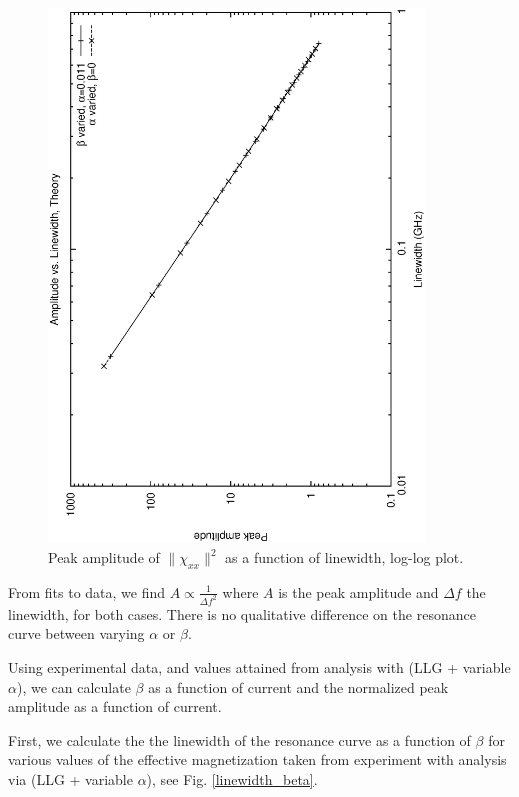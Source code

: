 \documentclass{article}
\begin{document}
\begin{figure}
  \centering
  \includegraphics[angle=-90,width=100mm]{fwhm_ampl_log.eps}
  \caption{Peak amplitude of $\| \chi_{xx} \|^2$ as a function of linewidth, log-log plot. \label{fwhm_ampl_log}}
\end{figure}

From fits to data, we find $A \propto \frac{1}{\Delta f^2}$ where $A$ is the peak amplitude and $\Delta f$ the linewidth, for both cases.
There is no qualitative difference on the resonance curve between varying $\alpha$ or $\beta$.

Using experimental data, and values attained from analysis with (LLG + variable $\alpha$), we can calculate $\beta$ as a function of current and the normalized peak amplitude as a function of current.

First, we calculate the the linewidth of the resonance curve as a function of $\beta$ for various values of the effective magnetization taken from experiment with analysis via (LLG + variable $\alpha$), see Fig. \ref{linewidth_beta}.
\end{document}
